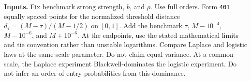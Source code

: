 
\textbf{Inputs.} Fix benchmark strong strength, \(b\), and \(\rho\).
Use full orders.
Form \texttt{401} equally spaced points for the normalized threshold distance
\(d_\tau=(M-\tau)/(M-1/2)\) on \([0,1]\).
Add the benchmark \(\tau\), \(M-10^{-4}\), \(M-10^{-6}\), and \(M+10^{-6}\).
At the endpoints, use the stated mathematical limits and tie convention rather than unstable logarithms.
Compare Laplace and logistic laws at the same scale parameter.
Do not claim equal variance.
At a common scale, the Laplace experiment Blackwell-dominates the logistic experiment.
Do not infer an order of entry probabilities from this dominance.
